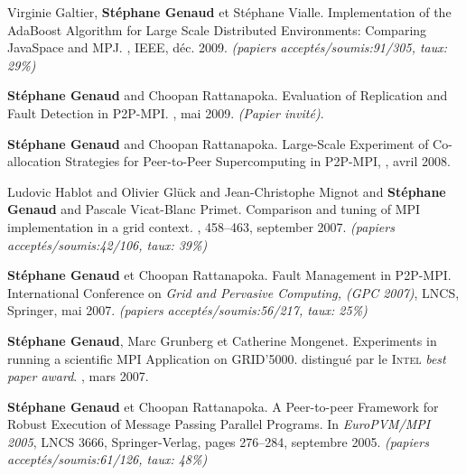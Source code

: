 \documentclass[11pt]{article}
\newcommand{\pmpi}{\mbox{\textsc{P2P-MPI}}}
\begin{document}
\begin{thebibliography}{99}
\newblock Virginie Galtier, \textbf{Stéphane Genaud} et Stéphane Vialle.
\newblock Implementation of the AdaBoost Algorithm for Large Scale Distributed 
Environments: Comparing JavaSpace and MPJ.
, 
IEEE, déc. 2009.
\newblock \small{\textit{(papiers acceptés/soumis:91/305, taux: 29\%)}}


\textbf{Stéphane Genaud} and Choopan Rattanapoka.
\newblock Evaluation of Replication and Fault Detection in P2P-MPI.
, mai 2009.
\newblock \textit{(Papier invité)}.

\textbf{Stéphane Genaud} and Choopan Rattanapoka. 
\newblock Large-Scale Experiment of Co-allocation Strategies for Peer-to-Peer Supercomputing in P2P-MPI,
, avril 2008.

Ludovic Hablot and Olivier Glück and Jean-Christophe Mignot and \textbf{Stéphane Genaud} and Pascale Vicat-Blanc Primet.
\newblock Comparison and tuning of MPI implementation in a grid context.
, 458--463, september 2007.
\newblock \small{\textit{(papiers acceptés/soumis:42/106, taux: 39\%)}}

\newblock \textbf{Stéphane Genaud} et Choopan Rattanapoka.
\newblock Fault Management in {\pmpi}. 
\newblock International Conference on {\em Grid and Pervasive Computing, (GPC 2007)}, LNCS, Springer, mai 2007.
\newblock \small{\textit{(papiers acceptés/soumis:56/217, taux: 25\%)}}

\newblock \textbf{Stéphane Genaud}, Marc Grunberg et Catherine Mongenet.
\newblock Experiments in running a scientific {MPI} Application on GRID'5000. 
\newblock distingué par le \textsc{Intel} \textit{best paper award}.
, mars 2007.


\textbf{Stéphane Genaud} et Choopan Rattanapoka.
\newblock A Peer-to-peer Framework for Robust Execution of Message Passing Parallel Programs.
\newblock In {\em EuroPVM/MPI 2005}, LNCS 3666, Springer-Verlag, pages 276--284, septembre 2005.
\newblock \small{\textit{(papiers acceptés/soumis:61/126, taux: 48\%)}}



\end{thebibliography}
\end{document}
